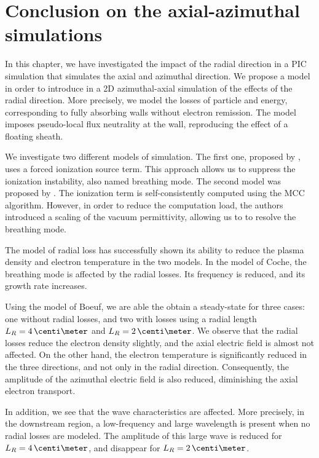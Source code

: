 
\section{Conclusion on the axial-azimuthal simulations}

In this chapter, we have investigated the impact of the radial direction in a \ac{PIC} simulation that simulates the axial and azimuthal direction.
We propose a model in order to introduce in a \ac{2D} azimuthal-axial simulation of the effects of the radial direction.
More precisely, we model the losses of particle and energy, corresponding to fully absorbing walls without electron remission.
The model imposes pseudo-local flux neutrality at the wall, reproducing the effect of a floating sheath.

We investigate two different models of simulation. The first one, proposed by \citet{boeuf2018}, uses a forced ionization source term.
This approach allows us to suppress the ionization instability, also named breathing mode.
The second model was proposed by \citet{coche2014}. 
The ionization term is self-consistently computed using the \ac{MCC} algorithm.
However, in order to reduce the computation load, the authors introduced a scaling of the vacuum permittivity, allowing us to to resolve the breathing mode.

\vspace{1em}
The model of radial loss has successfully shown its ability to reduce the plasma density and electron temperature in the two models.
In the model of Coche, the breathing mode is affected by the radial losses. 
Its frequency is reduced, and its growth rate increases.

Using the model of Boeuf, we are able the obtain a steady-state for three cases\string: one without radial losses, and two with losses using a radial length $L_R=4\,\centi\meter$ and $L_R=2\,\centi\meter$.
We observe that the radial losses reduce the electron density slightly, and the axial electric field is almost not affected.
On the other hand, the electron temperature is significantly reduced in the three directions, and not only in the radial direction.
Consequently, the amplitude of the azimuthal electric field is also reduced, diminishing the axial electron transport.

In addition, we see that the wave characteristics are affected.
More precisely, in the downstream region, a low-frequency and large wavelength is present when no radial losses are modeled.
The amplitude of this large wave is reduced for $L_R=4\,\centi\meter$, and disappear for $L_R=2\,\centi\meter$.

